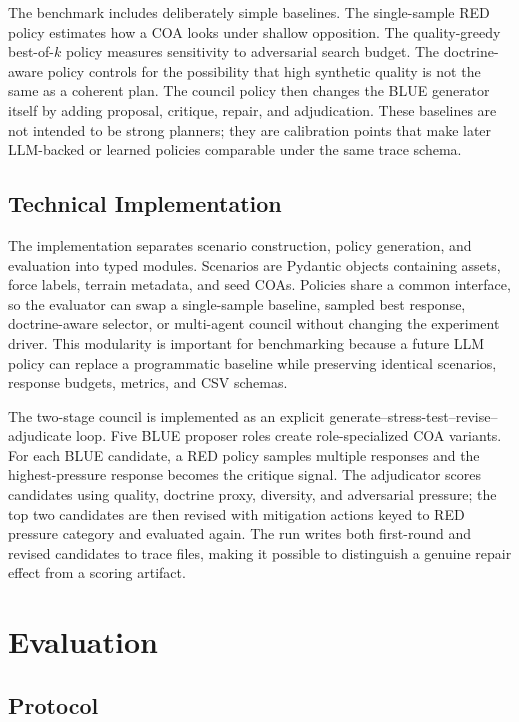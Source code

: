 \documentclass[letterpaper]{article}
\begin{document}
The benchmark includes deliberately simple baselines. The single-sample RED policy estimates how a COA looks under shallow opposition. The quality-greedy best-of-$k$ policy measures sensitivity to adversarial search budget. The doctrine-aware policy controls for the possibility that high synthetic quality is not the same as a coherent plan. The council policy then changes the BLUE generator itself by adding proposal, critique, repair, and adjudication. These baselines are not intended to be strong planners; they are calibration points that make later LLM-backed or learned policies comparable under the same trace schema.

\subsection{Technical Implementation}

The implementation separates scenario construction, policy generation, and evaluation into typed modules. Scenarios are Pydantic objects containing assets, force labels, terrain metadata, and seed COAs. Policies share a common interface, so the evaluator can swap a single-sample baseline, sampled best response, doctrine-aware selector, or multi-agent council without changing the experiment driver. This modularity is important for benchmarking because a future LLM policy can replace a programmatic baseline while preserving identical scenarios, response budgets, metrics, and CSV schemas.

The two-stage council is implemented as an explicit generate--stress-test--revise--adjudicate loop. Five BLUE proposer roles create role-specialized COA variants. For each BLUE candidate, a RED policy samples multiple responses and the highest-pressure response becomes the critique signal. The adjudicator scores candidates using quality, doctrine proxy, diversity, and adversarial pressure; the top two candidates are then revised with mitigation actions keyed to RED pressure category and evaluated again. The run writes both first-round and revised candidates to trace files, making it possible to distinguish a genuine repair effect from a scoring artifact.

\section{Evaluation}

\subsection{Protocol}
\end{document}
